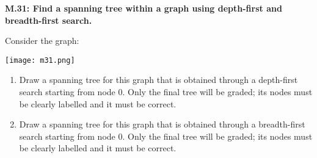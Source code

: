 \documentclass[11pt]{article}
\begin{document}
	
	\thispagestyle{empty}
	\renewcommand{\headrulewidth}{1pt}
	\thispagestyle{fancy}
	\lfoot{}
	\cfoot{}
	\rfoot{}	
	
	\vspace*{0in}

\noindent 
\textbf{M.31: Find a spanning tree within a graph using depth-first and breadth-first search.}

\bigskip

Consider the graph: 	
	\begin{center}
		\texttt{[image: m31.png]}
	\end{center}

\begin{enumerate}
	\item Draw a spanning tree for this graph that is obtained through a depth-first search starting from node 0. Only the final tree will be graded; its nodes must be clearly labelled and it must be correct. 

\vspace{3in}

	\item Draw a spanning tree for this graph that is obtained through a breadth-first search starting from node 0. Only the final tree will be graded; its nodes must be clearly labelled and it must be correct.  
\end{enumerate}
\end{document}

